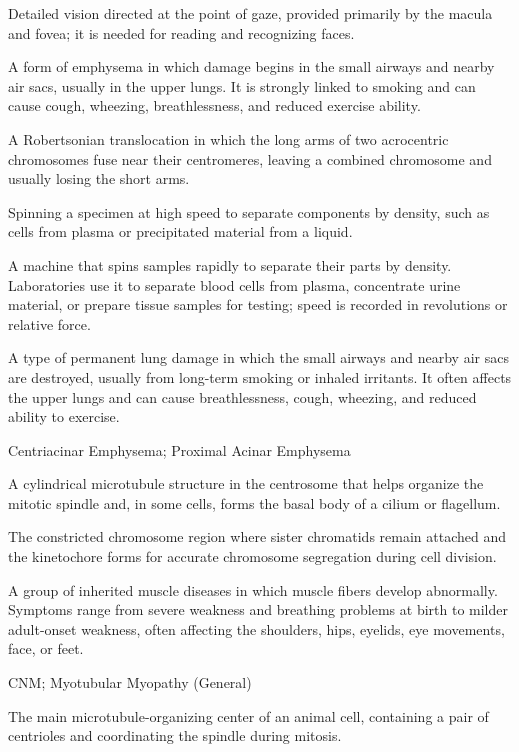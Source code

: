  Detailed vision directed at the point of gaze, provided primarily by the macula and fovea; it is needed for reading and recognizing faces.

 A form of emphysema in which damage begins in the small airways and nearby air sacs, usually in the upper lungs. It is strongly linked to smoking and can cause cough, wheezing, breathlessness, and reduced exercise ability.

 A Robertsonian translocation in which the long arms of two acrocentric chromosomes fuse near their centromeres, leaving a combined chromosome and usually losing the short arms.

 Spinning a specimen at high speed to separate components by density, such as cells from plasma or precipitated material from a liquid.

 A machine that spins samples rapidly to separate their parts by density. Laboratories use it to separate blood cells from plasma, concentrate urine material, or prepare tissue samples for testing; speed is recorded in revolutions or relative force.

 A type of permanent lung damage in which the small airways and nearby air sacs are destroyed, usually from long-term smoking or inhaled irritants. It often affects the upper lungs and can cause breathlessness, cough, wheezing, and reduced ability to exercise.

\synonyms
Centriacinar Emphysema; Proximal Acinar Emphysema

 A cylindrical microtubule structure in the centrosome that helps organize the mitotic spindle and, in some cells, forms the basal body of a cilium or flagellum.

 The constricted chromosome region where sister chromatids remain attached and the kinetochore forms for accurate chromosome segregation during cell division.

 A group of inherited muscle diseases in which muscle fibers develop abnormally. Symptoms range from severe weakness and breathing problems at birth to milder adult-onset weakness, often affecting the shoulders, hips, eyelids, eye movements, face, or feet.

\synonyms
CNM; Myotubular Myopathy (General)

 The main microtubule-organizing center of an animal cell, containing a pair of centrioles and coordinating the spindle during mitosis.

